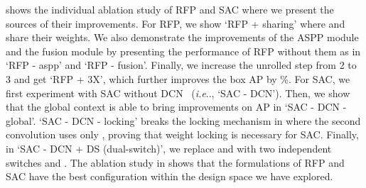 \documentclass[final]{cvpr}
\makeatletter
\def\@onedot{\ifx\@let@token.\else.\null\fi\xspace}
\DeclareRobustCommand\onedot{\futurelet\@let@token\@onedot}
\def\ie{\emph{i.e}\onedot} \def\Ie{\emph{I.e}\onedot}
\makeatother
\begin{document}
 shows the individual ablation study of RFP and SAC where we present the sources of their improvements.
For RFP,
we show `RFP + sharing' where  and  share their weights.
We also demonstrate the improvements of the ASPP module and the fusion module by presenting the performance of RFP without them as in `RFP - aspp' and `RFP - fusion'.
Finally, we increase the unrolled step  from 2 to 3 and get `RFP + 3X', which further improves the box AP by \%.
For SAC, we first experiment with SAC without DCN~\cite{dcn} (\ie, `SAC - DCN').
Then, we show that the global context is able to bring improvements on AP in `SAC - DCN - global'.
`SAC - DCN - locking' breaks the locking mechanism in  where the second convolution uses only , proving that weight locking is necessary for SAC.
Finally, in `SAC - DCN + DS (dual-switch)', we replace  and  with two independent switches  and .
The ablation study in  shows that the formulations of RFP and SAC have the best configuration within the design space we have explored.
\end{document}
